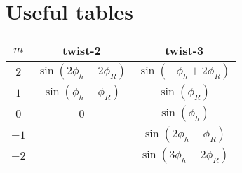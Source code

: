 \documentclass[12pt]{article}
\begin{document}
\section*{Useful tables}
\begin{center}
\begin{tabular}{|c|c|c|}
\hline
$m$ & twist-2 & twist-3 \\\hline\hline
$2$ & $\sin\left(2\phi_h-2\phi_R\right)$ & $\sin\left(-\phi_h+2\phi_R\right)$ \\\hline
$1$ & $\sin\left(\phi_h-\phi_R\right)$ & $\sin\left(\phi_R\right)$ \\\hline
$0$ & $0$ & $\sin\left(\phi_h\right)$ \\\hline
$-1$ & $~$ & $\sin\left(2\phi_h-\phi_R\right)$ \\\hline
$-2$ & $~$ & $\sin\left(3\phi_h-2\phi_R\right)$ \\\hline
\end{tabular}
\end{center}
\end{document}

